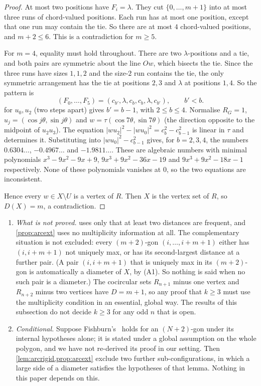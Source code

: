 \begin{proof}
At most two positions have $F_i=\lambda$. They cut $\{0,\dots,m+1\}$ into at most three runs of chord-valued positions. Each run has at most one position, except that one run may contain the tie. So there are at most $4$ chord-valued positions, and $m+2\le6$. This is a contradiction for $m\ge5$.

For $m=4$, equality must hold throughout. There are two $\lambda$-positions and a tie, and both pairs are symmetric about the line $Ow$, which bisects the tie. Since the three runs have sizes $1,1,2$ and the size-$2$ run contains the tie, the only symmetric arrangement has the tie at positions $2,3$ and $\lambda$ at positions $1,4$. So the pattern is
\[
(F_0,\dots,F_5)=(c_{b'},\lambda,c_b,c_b,\lambda,c_{b'}),\qquad b'<b.
\]
 for $u_0,u_2$ (two steps apart) gives $b'=b-1$, with $2\le b\le4$. Normalise $R_G=1$, $u_j=(\cos j\theta,\sin j\theta)$ and $w=\tau(\cos7\theta,\sin7\theta)$ (the direction opposite to the midpoint of $u_2u_3$). The equation $|wu_2|^2-|wu_0|^2=c_b^2-c_{b-1}^2$ is linear in $\tau$ and determines it. Substituting into $|wu_0|^2-c_{b-1}^2$ gives, for $b=2,3,4$, the numbers $0.6304\ldots$, $-0.4967\ldots$ and $-1.9811\ldots$. These are algebraic numbers with minimal polynomials $x^3-9x^2-9x+9$, $9x^3+9x^2-36x-19$ and $9x^3+9x^2-18x-1$ respectively. None of these polynomials vanishes at $0$, so the two equations are inconsistent.

Hence every $w\in X\setminus U$ is a vertex of $R$. Then $X$ is the vertex set of $R$, so $D(X)=m$, a contradiction.
\end{proof}

\begin{remark}[scope]\label{rem:oddscope}
\begin{enumerate}[leftmargin=2em,label=(\alph*)]
\item \emph{What is not proved.}  uses only that at least two distances are frequent, and \cref{prop:arcext} uses no multiplicity information at all. The complementary situation is not excluded: every $(m+2)$-gon $(i,\dots,i+m+1)$ either has $(i,i+m+1)$ not uniquely max, or has its second-largest distance at a further pair. (A pair $(i,i+m+1)$ that is uniquely max in its $(m+2)$-gon is automatically a diameter of $X$, by (A1). So nothing is said when no such pair is a diameter.) The cocircular sets $R_{n+1}$ minus one vertex and $R_{n+2}$ minus two vertices have $D=m+1$, so any proof that $k\ge3$ must use the multiplicity condition in an essential, global way. The results of this subsection do not decide $k\ge3$ for any odd $n$ that is open.
\item \emph{Conditional.} Suppose Fishburn's~\cite[Lemma~6]{Fi95} holds for an $(N+2)$-gon under its internal hypotheses alone; it is stated under a global assumption on the whole polygon, and we have not re-derived its proof in our setting. Then \cref{lem:arcrigid,prop:arcext} exclude two further sub-configurations, in which a large side of a diameter satisfies the hypotheses of that lemma. Nothing in this paper depends on this.
\end{enumerate}
\end{remark}

